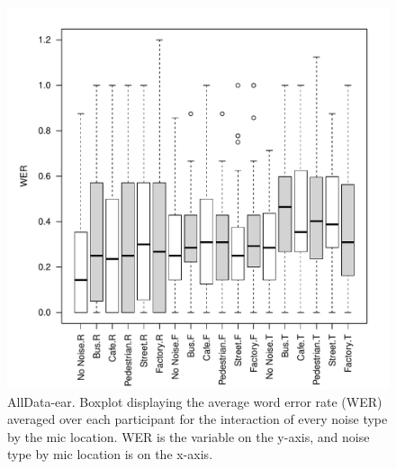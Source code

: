 \documentclass[dissertation,copyright]{uathesis}
\makeatletter
\def\maxwidth{ %
  \ifdim\Gin@nat@width>\linewidth
    \linewidth
  \else
    \Gin@nat@width
  \fi
}
\makeatother
\begin{document}
\begin{figure}

\includegraphics[width=\maxwidth]{figure/boxplot_noiseXmicXall_ear-1} 

\caption{AllData-ear. Boxplot displaying the average word error rate (WER) averaged over each participant for the interaction of every noise type by the mic location. WER is the variable on the y-axis, and noise type by mic location is on the x-axis.}
\label{fig:ALLXperc_noiseXmic_ear_boxplot}
\end{figure}
\end{document}
